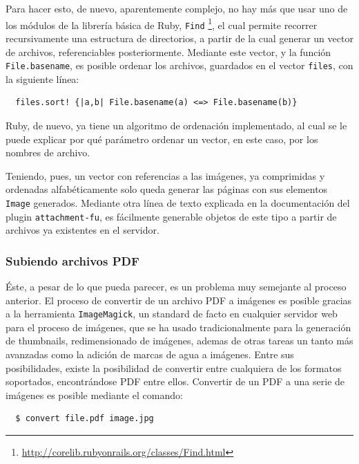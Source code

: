 Para hacer esto, de nuevo, aparentemente complejo, no hay más que usar uno de los módulos de la librería básica de Ruby, \texttt{Find} \footnote{\url{http://corelib.rubyonrails.org/classes/Find.html}}, el cual permite recorrer recursivamente una estructura de directorios, a partir de la cual generar un vector de archivos, referenciables posteriormente. Mediante este vector, y la función \texttt{File.basename}, es posible ordenar los archivos, guardados en el vector \texttt{files}, con la siguiente línea:

\begin{verbatim}
  files.sort! {|a,b| File.basename(a) <=> File.basename(b)}
\end{verbatim}

Ruby, de nuevo, ya tiene un algoritmo de ordenación implementado, al cual se le puede explicar por qué parámetro ordenar un vector, en este caso, por los nombres de archivo.

Teniendo, pues, un vector con referencias a las imágenes, ya comprimidas y ordenadas alfabéticamente solo queda generar las páginas con sus elementos \texttt{Image} generados. Mediante otra línea de texto explicada en la documentación del plugin \texttt{attachment-fu}, es fácilmente generable objetos de este tipo a partir de archivos ya existentes en el servidor.


\subsubsection{Subiendo archivos PDF} %
\label{ssub:subiendo_archivos_pdf}

Éste, a pesar de lo que pueda parecer, es un problema muy semejante al proceso anterior. El proceso de convertir de un archivo PDF a imágenes es posible gracias a la herramienta \texttt{ImageMagick}, un standard de facto en cualquier servidor web para el proceso de imágenes, que se ha usado tradicionalmente para la generación de thumbnails, redimensionado de imágenes, ademas de otras tareas un tanto más avanzadas como la adición de marcas de agua a imágenes. Entre sus posibilidades, existe la posibilidad de convertir entre cualquiera de los formatos soportados, encontrándose PDF entre ellos. Convertir de un PDF a una serie de imágenes es posible mediante el comando:

\begin{verbatim}
  $ convert file.pdf image.jpg
\end{verbatim}

